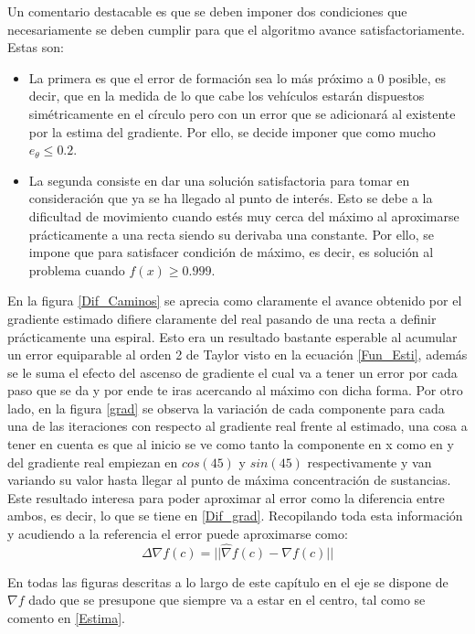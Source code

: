Un comentario destacable es que se deben imponer dos condiciones que necesariamente se deben cumplir para que el algoritmo avance satisfactoriamente. Estas son:

\begin{itemize}
	\item La primera es que el error de formación sea lo más próximo a 0 posible, es decir, que en la medida de lo que cabe los vehículos estarán dispuestos simétricamente en el círculo pero con un error que se adicionará al existente por la estima del gradiente. Por ello, se decide imponer que como mucho $e_{\theta}\leq{0.2}$.
	\item La segunda consiste en dar una solución satisfactoria para tomar en consideración que ya se ha llegado al punto de interés. Esto se debe a la dificultad de movimiento cuando estés muy cerca del máximo al aproximarse prácticamente a una recta siendo su derivaba una constante. Por ello, se impone que para satisfacer condición de máximo, es decir, es solución al problema cuando $f(x)\geq{0.999}$.
\end{itemize}

En la figura \ref{Dif_Caminos} se aprecia como claramente el avance obtenido por el gradiente estimado difiere claramente del real pasando de una recta a definir prácticamente una espiral. Esto era un resultado bastante esperable al acumular un error equiparable al orden 2 de Taylor visto en la ecuación \ref{Fun_Esti}, además se le suma el efecto del ascenso de gradiente el cual va a tener un error por cada paso que se da y por ende te iras acercando al máximo con dicha forma. Por otro lado, en la figura \ref{grad} se observa la variación de cada componente para cada una de las iteraciones con respecto al gradiente real frente al estimado, una cosa a tener en cuenta es que al inicio se ve como tanto la componente en x como en y del gradiente real empiezan en $cos(45)$ y $sin(45)$ respectivamente y van variando su valor hasta llegar al punto de máxima concentración de sustancias. Este resultado interesa para poder aproximar al error como la diferencia entre ambos, es decir, lo que se tiene en \ref{Dif_grad}.
\newpage
Recopilando toda esta información y acudiendo a la referencia \cite{Estimacion_Gradiente} el error puede aproximarse como:
\begin{equation} \label{error_gradiente}
	\Delta{\nabla{f\left(c\right)}}=||\hat{\nabla}f\left(c\right)-\nabla{f}\left(c\right)||
\end{equation}

En todas las figuras descritas a lo largo de este capítulo en el eje se dispone de $\nabla{f}$ dado que se presupone que siempre va a estar en el centro, tal como se comento en \ref{Estima}.

